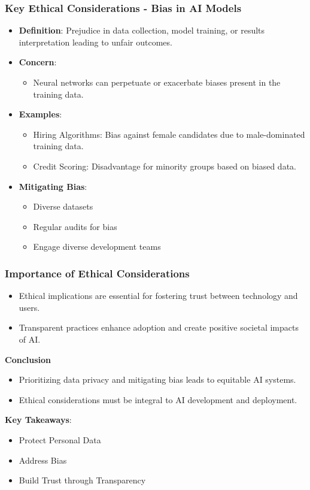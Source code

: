\documentclass[aspectratio=169]{beamer}
\begin{document}
\begin{frame}[fragile]
    \frametitle{Key Ethical Considerations - Bias in AI Models}
    \begin{itemize}
        \item \textbf{Definition}: Prejudice in data collection, model training, or results interpretation leading to unfair outcomes.
        \item \textbf{Concern}:
        \begin{itemize}
            \item Neural networks can perpetuate or exacerbate biases present in the training data.
        \end{itemize}
        \item \textbf{Examples}:
        \begin{itemize}
            \item Hiring Algorithms: Bias against female candidates due to male-dominated training data.
            \item Credit Scoring: Disadvantage for minority groups based on biased data.
        \end{itemize}
        \item \textbf{Mitigating Bias}:
        \begin{itemize}
            \item Diverse datasets
            \item Regular audits for bias
            \item Engage diverse development teams
        \end{itemize}
    \end{itemize}
\end{frame}

\begin{frame}[fragile]
    \frametitle{Importance of Ethical Considerations}
    \begin{itemize}
        \item Ethical implications are essential for fostering trust between technology and users.
        \item Transparent practices enhance adoption and create positive societal impacts of AI.
    \end{itemize}
    \textbf{Conclusion}
    \begin{itemize}
        \item Prioritizing data privacy and mitigating bias leads to equitable AI systems.
        \item Ethical considerations must be integral to AI development and deployment.
    \end{itemize}
    \textbf{Key Takeaways}:
    \begin{itemize}
        \item Protect Personal Data
        \item Address Bias
        \item Build Trust through Transparency
    \end{itemize}
\end{frame}
\end{document}
